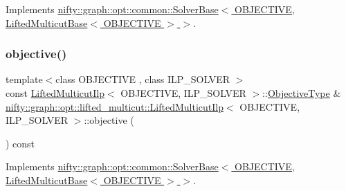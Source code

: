 Implements \hyperlink{classnifty_1_1graph_1_1opt_1_1common_1_1SolverBase_af638b9a804cfec3e35fe87c77e942d30}{nifty\+::graph\+::opt\+::common\+::\+Solver\+Base$<$ O\+B\+J\+E\+C\+T\+I\+V\+E, Lifted\+Multicut\+Base$<$ O\+B\+J\+E\+C\+T\+I\+V\+E $>$ $>$}.

\mbox{\label{classnifty_1_1graph_1_1opt_1_1lifted__multicut_1_1LiftedMulticutIlp_ab8d9679a9568dd6f0838bea4c4ed14ac}} 
\subsubsection{\texorpdfstring{objective()}{objective()}}
{\footnotesize\ttfamily template$<$class O\+B\+J\+E\+C\+T\+I\+VE , class I\+L\+P\+\_\+\+S\+O\+L\+V\+ER $>$ \\
const \hyperlink{classnifty_1_1graph_1_1opt_1_1lifted__multicut_1_1LiftedMulticutIlp}{Lifted\+Multicut\+Ilp}$<$ O\+B\+J\+E\+C\+T\+I\+VE, I\+L\+P\+\_\+\+S\+O\+L\+V\+ER $>$\+::\hyperlink{classnifty_1_1graph_1_1opt_1_1lifted__multicut_1_1LiftedMulticutIlp_a4c1ed011eb6ea9ec5845249bc94869c8}{Objective\+Type} \& \hyperlink{classnifty_1_1graph_1_1opt_1_1lifted__multicut_1_1LiftedMulticutIlp}{nifty\+::graph\+::opt\+::lifted\+\_\+multicut\+::\+Lifted\+Multicut\+Ilp}$<$ O\+B\+J\+E\+C\+T\+I\+VE, I\+L\+P\+\_\+\+S\+O\+L\+V\+ER $>$\+::objective (\begin{DoxyParamCaption}{ }\end{DoxyParamCaption}) const\hspace{0.3cm}{\ttfamily [virtual]}}



Implements \hyperlink{classnifty_1_1graph_1_1opt_1_1common_1_1SolverBase_a55e9eb645c07d6e0782ebfb990ab3c84}{nifty\+::graph\+::opt\+::common\+::\+Solver\+Base$<$ O\+B\+J\+E\+C\+T\+I\+V\+E, Lifted\+Multicut\+Base$<$ O\+B\+J\+E\+C\+T\+I\+V\+E $>$ $>$}.

\mbox{\label{classnifty_1_1graph_1_1opt_1_1lifted__multicut_1_1LiftedMulticutIlp_a688693c86bce98f025a257b656044079}} 
